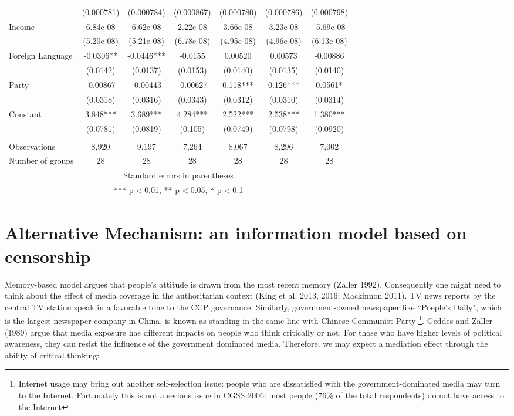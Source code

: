 \documentclass[12pt]{article}\usepackage[]{graphicx}\usepackage[]{color}
\begin{document}
\begin{table}[htbp]
\begin{tabular}{lcccccc}
		& (0.000781) & (0.000784) & (0.000867) & (0.000780) & (0.000786) & (0.000798) \\
		Income & 6.84e-08 & 6.62e-08 & 2.22e-08 & 3.66e-08 & 3.23e-08 & -5.69e-08 \\
		& (5.20e-08) & (5.21e-08) & (6.78e-08) & (4.95e-08) & (4.96e-08) & (6.13e-08) \\
		Foreign Language & -0.0306** & -0.0446*** & -0.0155 & 0.00520 & 0.00573 & -0.00886 \\
		& (0.0142) & (0.0137) & (0.0153) & (0.0140) & (0.0135) & (0.0140) \\
		Party & -0.00867 & -0.00443 & -0.00627 & 0.118*** & 0.126*** & 0.0561* \\
		& (0.0318) & (0.0316) & (0.0343) & (0.0312) & (0.0310) & (0.0314) \\
		Constant & 3.848*** & 3.689*** & 4.284*** & 2.522*** & 2.538*** & 1.380*** \\
		& (0.0781) & (0.0819) & (0.105) & (0.0749) & (0.0798) & (0.0920) \\
		&       &       &       &       &       &  \\
		Observations & 8,920 & 9,197 & 7,264 & 8,067 & 8,296 & 7,002 \\
		Number of groups & 28    & 28    & 28    & 28    & 28    & 28 \\
		\hline
		\multicolumn{7}{c}{Standard errors in parentheses} \\
		\multicolumn{7}{c}{*** p$<$0.01, ** p$<$0.05, * p$<$0.1} \\

	\end{tabular}%
\end{table}%






\newpage

\section{Alternative Mechanism: an information model based on censorship}
Memory-based model argues that people's attitude is drawn from the most recent memory (Zaller 1992). Consequently one might need to think about the effect of media coverage in the authoritarian context (King et al. 2013, 2016; Mackinnon 2011). TV news reports by the central TV station speak in a favorable tone to the CCP governance. Similarly, government-owned newspaper like ``Poeple's Daily", which is the largest newspaper company in China, is known as standing in the same line with Chinese Communist Party \footnote{Internet usage may bring out another self-selection issue: people who are dissatisfied with the government-dominated media may turn to the Internet. Fortunately this is not a serious issue in CGSS 2006: most people (76\% of the total respondents) do not have access to the Internet}. Geddes and Zaller (1989) argue that media exposure has different impacts on people who think critically or not. For those who have higher levels of political awareness, they can resist the influence of the government dominated media. Therefore, we may expect a mediation effect through the ability of critical thinking:
\end{document}
